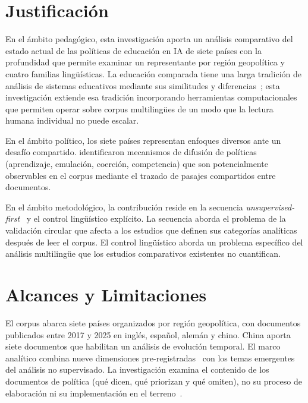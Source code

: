 \section{Justificación}
\label{sec:justificacion}

En el ámbito pedagógico, esta investigación aporta un análisis comparativo del estado actual de las políticas de educación en IA de siete países con la profundidad que permite examinar un representante por región geopolítica y cuatro familias lingüísticas. La educación comparada tiene una larga tradición de análisis de sistemas educativos mediante sus similitudes y diferencias~\citep{milosevic2020methodology}; esta investigación extiende esa tradición incorporando herramientas computacionales que permiten operar sobre corpus multilingües de un modo que la lectura humana individual no puede escalar.

En el ámbito político, los siete países representan enfoques diversos ante un desafío compartido. \citet{shipan2012diffusion} identificaron mecanismos de difusión de políticas (aprendizaje, emulación, coerción, competencia) que son potencialmente observables en el corpus mediante el trazado de pasajes compartidos entre documentos.

En el ámbito metodológico, la contribución reside en la secuencia \textit{unsupervised-first}~\citep{nelson2020computational} y el control lingüístico explícito. La secuencia aborda el problema de la validación circular que afecta a los estudios que definen sus categorías analíticas después de leer el corpus. El control lingüístico aborda un problema específico del análisis multilingüe que los estudios comparativos existentes no cuantifican.


\section{Alcances y Limitaciones}
\label{sec:alcances}

El corpus abarca siete países organizados por región geopolítica, con documentos publicados entre 2017 y 2025 en inglés, español, alemán y chino. China aporta siete documentos que habilitan un análisis de evolución temporal. El marco analítico combina nueve dimensiones pre-registradas~\citep{oecd2021epo,unesco2019beijing,miao2021guidance} con los temas emergentes del análisis no supervisado. La investigación examina el contenido de los documentos de política (qué dicen, qué priorizan y qué omiten), no su proceso de elaboración ni su implementación en el terreno~\citep{rizvi2010globalizing}.


